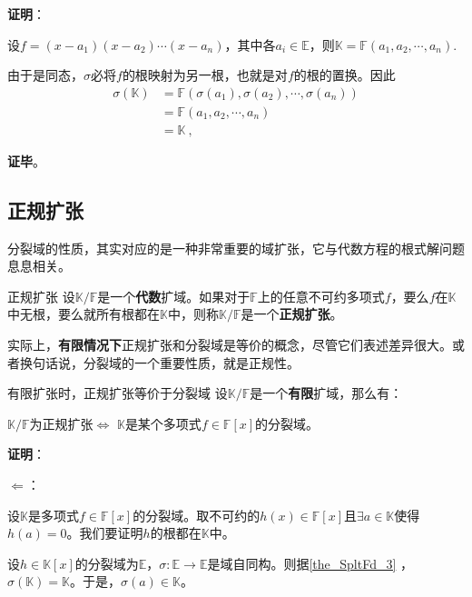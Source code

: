 \textbf{证明}：

设$f=(x-a_1)(x-a_2)\cdots(x-a_n)$，其中各$a_i\in\mathbb{E}$，则$\mathbb{K}=\mathbb{F}(a_1, a_2, \cdots, a_n)$.

由于是同态，$\sigma$必将$f$的根映射为另一根，也就是对$f$的根的置换。因此
\begin{equation}
\begin{aligned}
\sigma(\mathbb{K})&=\mathbb{F}(\sigma(a_1), \sigma(a_2), \cdots, \sigma(a_n))\\
&=\mathbb{F}(a_1, a_2, \cdots, a_n)\\
&=\mathbb{K}~,
\end{aligned}
\end{equation}

\textbf{证毕}。




\subsection{正规扩张}

分裂域的性质，其实对应的是一种非常重要的域扩张，它与代数方程的根式解问题息息相关。

\begin{definition}{正规扩张}
设$\mathbb{K}/\mathbb{F}$是一个\textbf{代数}扩域。如果对于$\mathbb{F}$上的任意不可约多项式$f$，要么$f$在$\mathbb{K}$中无根，要么就所有根都在$\mathbb{K}$中，则称$\mathbb{K}/\mathbb{F}$是一个\textbf{正规扩张}。
\end{definition}

实际上，\textbf{有限情况下}正规扩张和分裂域是等价的概念，尽管它们表述差异很大。或者换句话说，分裂域的一个重要性质，就是正规性。


\begin{theorem}{有限扩张时，正规扩张等价于分裂域}\label{the_SpltFd_2}
设$\mathbb{K}/\mathbb{F}$是一个\textbf{有限}扩域，那么有：

$\mathbb{K}/\mathbb{F}$为正规扩张$\iff$ $\mathbb{K}$是某个多项式$f\in\mathbb{F}[x]$的分裂域。
\end{theorem}

\textbf{证明}：

$\Leftarrow$：

设$\mathbb{K}$是多项式$f\in\mathbb{F}[x]$的分裂域。取不可约的$h(x)\in\mathbb{F}[x]$且$\exists a\in\mathbb{K}$使得$h(a)=0$。我们要证明$h$的根都在$\mathbb{K}$中。


设$h\in\mathbb{K}[x]$的分裂域为$\mathbb{E}$，$\sigma:\mathbb{E}\to\mathbb{E}$是域自同构。则据\autoref{the_SpltFd_3} ，$\sigma(\mathbb{K})=\mathbb{K}$。于是，$\sigma(a)\in\mathbb{K}$。

